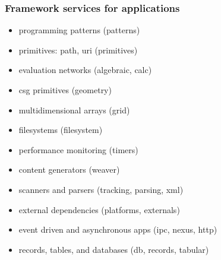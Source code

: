 \begin{frame}
%
  \frametitle{Framework services for applications}
%
  \begin{itemize}
  \item programming patterns (patterns)
  \item primitives: path, uri (primitives)
  \item evaluation networks (algebraic, calc)
  \item csg primitives (geometry)
  \item multidimensional arrays (grid)
  \item filesystems (filesystem)
  \item performance monitoring (timers)
  \item content generators (weaver)
  \item scanners and parsers (tracking, parsing, xml)
  \item external dependencies (platforms, externals)
  \item event driven and asynchronous apps (ipc, nexus, http)
  \item records, tables, and databases (db, records, tabular)
  \end{itemize}
%
\end{frame}

